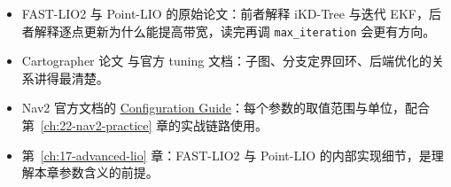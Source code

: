 \begin{reading}

\begin{itemize}
  \item FAST-LIO2 \cite{xu2022fastlio2} 与 Point-LIO \cite{he2023pointlio} 的原始论文：前者解释 iKD-Tree 与迭代 EKF，后者解释逐点更新为什么能提高带宽，读完再调 \lstinline{max_iteration} 会更有方向。
  \item Cartographer 论文 \cite{hess2016cartographer} 与官方 tuning 文档：子图、分支定界回环、后端优化的关系讲得最清楚。
  \item Nav2 官方文档的 \href{https://docs.nav2.org/configuration/index.html}{Configuration Guide}：每个参数的取值范围与单位，配合第~\ref{ch:22-nav2-practice} 章的实战链路使用。
  \item 第~\ref{ch:17-advanced-lio} 章：FAST-LIO2 与 Point-LIO 的内部实现细节，是理解本章参数含义的前提。
\end{itemize}


\end{reading}
